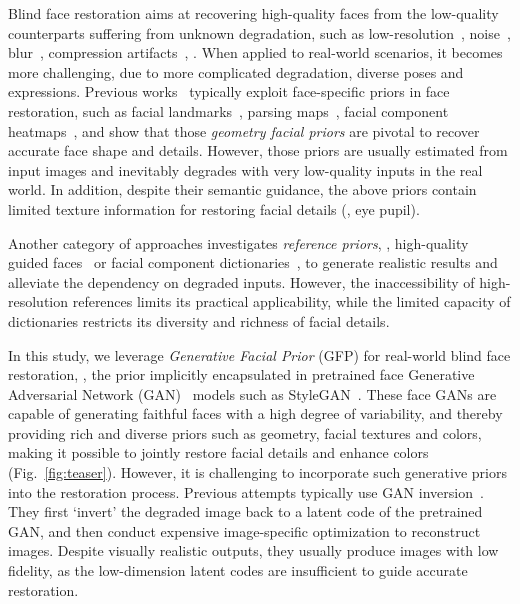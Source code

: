 \documentclass[final]{cvpr}
\begin{document}
Blind face restoration aims at recovering high-quality faces from the low-quality counterparts suffering from unknown degradation, such as low-resolution~\cite{dong2014learning,lim2017edsr,chen2018fsrnet}, noise~\cite{zhang2017beyond}, blur~\cite{kupyn2018deblurgan,shen2018deep}, compression artifacts~\cite{dong2015compression}, \etc. 
When applied to real-world scenarios, it becomes more challenging, due to more complicated degradation, diverse poses and expressions.
Previous works~\cite{chen2018fsrnet,yu2018face,chen2020psfrgan} typically exploit face-specific priors in face restoration, such as facial landmarks~\cite{chen2018fsrnet}, parsing maps~\cite{chen2020psfrgan,chen2018fsrnet}, facial component heatmaps~\cite{yu2018face}, and show that those \textit{geometry facial priors} are pivotal to recover accurate face shape and details. 
However, those priors are usually estimated from input images and inevitably degrades with very low-quality inputs in the real world. 
In addition, despite their semantic guidance, the above priors contain limited texture information for restoring facial details (\eg, eye pupil). 

Another category of approaches investigates \textit{reference priors}, \ie, high-quality guided faces~\cite{li2018GFRNet,li2020enhanced,dogan2019exemplar} or facial component dictionaries~\cite{li2020dfdnet}, to generate realistic results and alleviate the dependency on degraded inputs. 
However, the inaccessibility of high-resolution references limits its practical applicability, while the limited capacity of dictionaries restricts its diversity and richness of facial details. 

In this study, we leverage \textit{Generative Facial Prior} (GFP) for real-world blind face restoration, \ie, the prior implicitly encapsulated in pretrained face Generative Adversarial Network (GAN)~\cite{goodfellow2014gan} models such as StyleGAN~\cite{karras2018stylegan,karras2020stylegan2}.
These face GANs are capable of generating faithful faces with a high degree of variability, and thereby providing rich and diverse priors such as geometry, facial textures and colors, making it possible to jointly restore facial details and enhance colors (Fig.~\ref{fig:teaser}). 
However, it is challenging to incorporate such generative priors into the restoration process. 
Previous attempts typically use GAN inversion~\cite{gu2020mGANprior,pan2020dgp,menon2020pulse}. They first `invert' the degraded image back to a latent code of the pretrained GAN, and then conduct expensive image-specific optimization to reconstruct images.  
Despite visually realistic outputs, they usually produce images with low fidelity, as the low-dimension latent codes are insufficient to guide accurate restoration.
\end{document}
